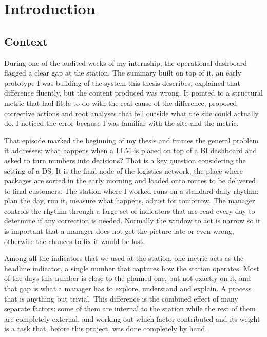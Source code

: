 \documentclass[12pt,a4paper,openright,twoside]{book}
\begin{document}
\chapter{Introduction}
\label{chap:introduction}

\section{Context}
During one of the audited weeks of my internship, the operational dashboard flagged a clear gap at the station. 
The summary built on top of it, an early prototype I was building of the system this thesis describes, explained that difference fluently, but the content produced was wrong. 
It pointed to a structural metric that had little to do with the real cause of the difference, proposed corrective actions and root analyses that fell outside what the site could actually do.
I noticed the error because I was familiar with the site and the metric.

That episode marked the beginning of my thesis and frames the general problem it addresses: what happens when a \ac{LLM} is placed on top of a \ac{BI} dashboard and asked to turn numbers into decisions? 
That is a key question considering the setting of a \ac{DS}. 
It is the final node of the logistics network, the place where packages are sorted in the early morning and loaded onto routes to be delivered to final customers.
The station where I worked runs on a standard daily rhythm: plan the day, run it, measure what happens, adjust for tomorrow. 
The manager controls the rhythm through a large set of indicators that are read every day to determine if any correction is needed. Normally the window to act is narrow so it is important that a manager does not get the picture late or even wrong, otherwise the chances to fix it would be lost.

Among all the indicators that we used at the station, one metric acts as the headline indicator, a single number that captures how the station operates.
Most of the days this number is close to the planned one, but not exactly on it, and that gap is what a manager has to explore, understand and explain. 
A process that is anything but trivial.
This difference is the combined effect of many separate factors: some of them are internal to the station while the rest of them are completely external, and working out which factor contributed and its weight is a task that, before this project, was done completely by hand.
\end{document}
